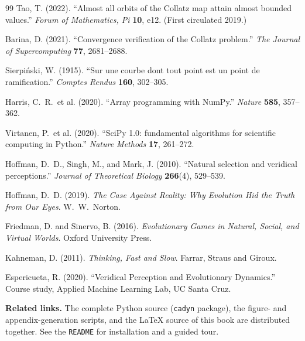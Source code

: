 \begin{thebibliography}{99}
 Tao, T. (2022).
  ``Almost all orbits of the Collatz map attain almost bounded
  values.'' \emph{Forum of Mathematics, Pi} \textbf{10}, e12.
  (First circulated 2019.)

 Barina, D. (2021).
  ``Convergence verification of the Collatz problem.''
  \emph{The Journal of Supercomputing} \textbf{77}, 2681--2688.

 Sierpi\'nski, W. (1915).
  ``Sur une courbe dont tout point est un point de ramification.''
  \emph{Comptes Rendus} \textbf{160}, 302--305.

 Harris, C.~R.\ et al. (2020).
  ``Array programming with NumPy.''
  \emph{Nature} \textbf{585}, 357--362.

 Virtanen, P.\ et al. (2020).
  ``SciPy 1.0: fundamental algorithms for scientific computing in
  Python.'' \emph{Nature Methods} \textbf{17}, 261--272.

 Hoffman, D.~D., Singh, M., and Mark, J. (2010).
  ``Natural selection and veridical perceptions.''
  \emph{Journal of Theoretical Biology} \textbf{266}(4), 529--539.

 Hoffman, D.~D. (2019).
  \emph{The Case Against Reality: Why Evolution Hid the Truth from Our
  Eyes}. W.~W.~Norton.

 Friedman, D. and Sinervo, B. (2016).
  \emph{Evolutionary Games in Natural, Social, and Virtual Worlds}.
  Oxford University Press.

 Kahneman, D. (2011).
  \emph{Thinking, Fast and Slow}. Farrar, Straus and Giroux.

 Espericueta, R. (2020).
  ``Veridical Perception and Evolutionary Dynamics.'' Course study,
  Applied Machine Learning Lab, UC Santa Cruz.

\end{thebibliography}

\vspace{2em}
\noindent\textbf{Related links.}\quad
The complete Python source (\texttt{cadyn} package), the figure-
and appendix-generation scripts, and the LaTeX source of this book are
distributed together.  See the \texttt{README} for installation and a
guided tour.
